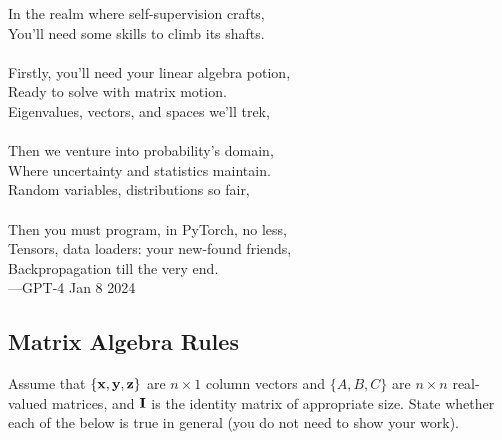 \begin{table}
 \begin{framed}
 \footnotesize
In the realm where self-supervision crafts,\\ 
You'll need some skills to climb its shafts. \\ \\
Firstly, you'll need your linear algebra potion, \\ 
Ready to solve with matrix motion. \\ 
Eigenvalues, vectors, and spaces we'll trek, \\ \\
Then we venture into probability's domain, \\ 
Where uncertainty and statistics maintain. \\ 
Random variables, distributions so fair,  \\ \\
Then you must program, in PyTorch, no less, \\ 
Tensors, data loaders: your new-found friends,\\ 
Backpropagation till the very end.  \\

\hspace{3.5cm}---GPT-4 Jan 8 2024 
\end{framed}
\end{table}
\subsection{Matrix Algebra Rules}

Assume that $\left\lbrace \mathbf{x}, \mathbf{y}, \mathbf{z} \right\rbrace$ are $n \times 1$ column vectors and $\{A, B, C\}$ are $n \times n$ real-valued matrices, 
and $\mathbf{I}$ is the identity matrix of appropriate size. State whether each of the below is true in general (you do not need to show your work).

